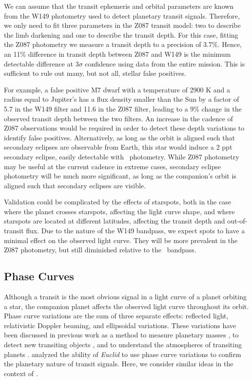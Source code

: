 We can assume that the transit ephemeris and orbital parameters are known from the W149 photometry used to detect planetary transit signals. Therefore, we only need
to fit three parameters
in the Z087 transit model: two to describe the limb darkening and one to describe the transit
depth.
For this case, fitting the Z087 photometry we measure a transit depth to a precision of 
3.7\%. Hence, an 11\% difference in transit depth between Z087 and W149 is the minimum detectable difference at $3\sigma$ confidence using data from the entire
mission. This is sufficient to rule out many, but not all, stellar false positives.

For example, a false positive M7 dwarf with a temperature of 2900 K and a radius equal to Jupiter's
has a flux density smaller than the Sun by a factor of 5.7 in the W149 filter and 11.6 in
the Z087 filter, leading to a 9\% change in the observed transit depth between the 
two filters.
An increase in the cadence of Z087 observations would be required in order to detect
these depth variations to identify false positives. 
Alternatively, as long as the orbit is aligned such that secondary eclipses are
observable from Earth, this star would induce a 2 ppt secondary eclipse, easily detectable with
\WF\ photometry. 
While Z087 photometry may be useful at the current cadence in extreme cases, secondary
eclipse photometry will be much more significant, as long as the companion's orbit is
aligned such that secondary eclipses are visible.

Validation could be complicated by the effects of starspots, both in the case where
the planet crosses starspots, affecting the light curve shape, and where starspots
are located at different latitudes, affecting the transit depth and out-of-transit flux. 
Due to the nature of the W149 bandpass, we expect spots to have a minimal effect
on the observed light curve. 
They will be more prevalent in the Z087 photometry, 
but still diminished relative to the \kep\ bandpass.


\subsection{Phase Curves}
\label{sec:PC}


Although a transit is the most obvious signal in a light curve of a planet orbiting a
star, the companion planet affects the observed light curve throughout its orbit.
Phase curve variations are the sum of three separate effects:
reflected light, relativistic 
Doppler beaming, and ellipsoidal variations. 
These variations have been discussed in previous work as a method to measure planetary
masses \citep{Faigler11, Mislis12}, to detect new transiting objects \citep{Faigler15b}, and to
understand the atmospheres of transiting planets \citep{Knutson07, Faigler15a}.
\citet{McDonald14} analyzed the ability of \textit{Euclid} to use phase curve
variations to confirm the planetary nature of transit signals.
Here, we consider similar ideas in the context of \WF.


